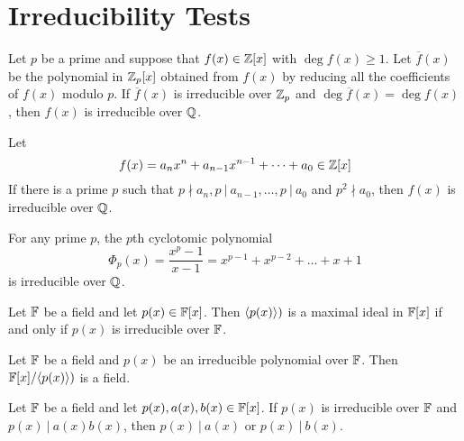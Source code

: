 \section{Irreducibility Tests}

\begin{theorem}
	Let $p$ be a prime and suppose that $f(x) \in \mathbb{Z}[x]$ with $\deg f(x) \geq 1$. Let $\overline{f}(x)$ be the polynomial in $\mathbb{Z}_p[x]$ obtained from $f(x)$ by reducing all the coefficients of $f(x)$ modulo $p$. If $\overline{f}(x)$ is irreducible over $\mathbb{Z}_p$ and $\deg \overline{f}(x) = \deg f(x)$, then $f(x)$ is irreducible over $\mathbb{Q}$.
\end{theorem}

\begin{theorem}
	Let
	\[ f(x) = a_nx^n + a_{n-1}x^{n-1} + \dots + a_0 \in \mathbb{Z}[x] \]
	\noindent If there is a prime $p$ such that $p \nmid a_n, p\ \vert\ a_{n-1}, \dots, p\ \vert\ a_0$ and $p^2 \nmid a_0$, then $f(x)$ is irreducible over $\mathbb{Q}$.
\end{theorem}

\begin{corollary}
	For any prime $p$, the $p$th cyclotomic polynomial
	\[ \Phi_p(x) = \frac{x^p - 1}{x-1} = x^{p-1} + x^{p-2} + \dots + x + 1 \]
	\noindent is irreducible over $\mathbb{Q}$.
\end{corollary}

\begin{theorem}
	Let $\mathbb{F}$ be a field and let $p(x) \in \mathbb{F}[x]$. Then $\langle p(x) \rangle)$ is a maximal ideal in $\mathbb{F}[x]$ if and only if $p(x)$ is irreducible over $\mathbb{F}$.
\end{theorem}

\begin{corollary}
	Let $\mathbb{F}$ be a field and $p(x)$ be an irreducible polynomial over $\mathbb{F}$. Then $\mathbb{F}[x]/\langle p(x) \rangle)$ is a field.
\end{corollary}

\begin{corollary}
	Let $\mathbb{F}$ be a field and let $p(x), a(x), b(x) \in \mathbb{F}[x]$. If $p(x)$ is irreducible over $\mathbb{F}$ and $p(x)\ \vert\ a(x)b(x)$, then $p(x)\ \vert\ a(x)$ or $p(x)\ \vert\ b(x)$.
\end{corollary}
